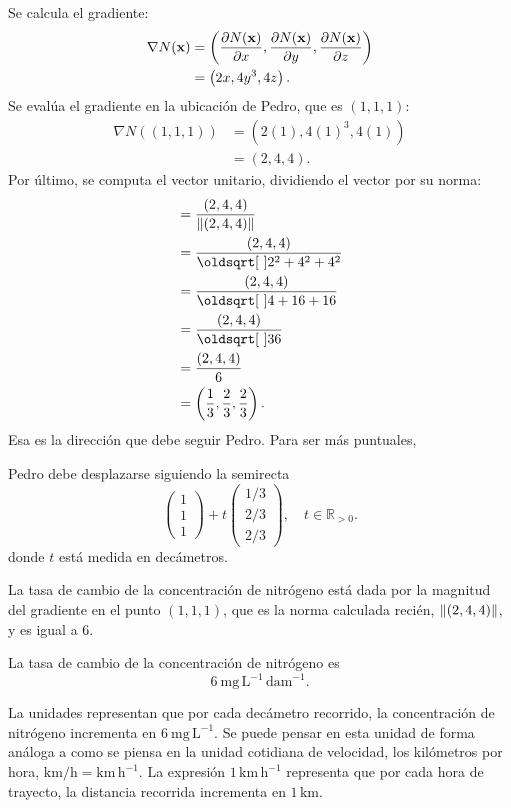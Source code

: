 \documentclass{fmbvecto}
\begin{document}
\begin{problema}[Pedro]
Se calcula el gradiente:
\begin{align*}
    \nabla N(\bvec{x}) &= \left( \dparder[N(\bvec{x})][x], \dparder[N(\bvec{x})][y], \dparder[N(\bvec{x})][z] \right) \\
    &= \left( 2x, 4y^3, 4z\right).
\end{align*}
Se evalúa el gradiente en la ubicación de Pedro, que es \((1, 1, 1)\):
\begin{align*}
    \nabla N((1, 1, 1)) &= \left( 2(1), 4(1)^3, 4(1)\right) \\
    &= \left( 2, 4, 4\right).
\end{align*}
Por último, se computa el vector unitario, dividiendo el vector por su norma:
\begin{align*}
    &= \frac{( 2, 4, 4)}{\norm{(2, 4, 4)}} \\
    &= \frac{( 2, 4, 4)}{\sqrt{2^2 + 4^2 + 4^2}} \\
    &= \frac{( 2, 4, 4)}{\sqrt{4 + 16 + 16}} \\
    &= \frac{( 2, 4, 4)}{\sqrt{36}}\\
    &= \frac{( 2, 4, 4)}{6}\\
    &= \left( \frac{1}{3}, \frac{2}{3}, \frac{2}{3}\right).
\end{align*}
Esa es la dirección que debe seguir Pedro. Para ser más puntuales, 
\begin{gbox}
    Pedro debe desplazarse siguiendo la semirecta \[\begin{pmatrix}
        1 \\ 1 \\ 1
    \end{pmatrix} + t\begin{pmatrix}
        1/3 \\ 2/3 \\ 2/3
        \end{pmatrix}, \quad t\in \mathbb{R}_{>0}. \]
    donde \(t\) está medida en decámetros.
\end{gbox}

La tasa de cambio de la concentración de nitrógeno está dada por la magnitud del gradiente en el punto \((1, 1, 1)\), que es la norma calculada recién, \(\left\lVert (2, 4, 4) \right\rVert\), y es igual a 6.
\begin{gbox}
    La tasa de cambio de la concentración de nitrógeno es \[6 \ \text{mg} \, \text{L}^{-1} \, \text{dam}^{-1}. \]
\end{gbox}
La unidades representan que por cada decámetro recorrido, la concentración de nitrógeno incrementa en \(6 \ \text{mg} \, \text{L}^{-1}\). Se puede pensar en esta unidad de forma análoga a como se piensa en la unidad cotidiana de velocidad, los kilómetros por hora, \( \text{km} / \text{h} = \text{km} \, \text{h}^{-1}\). La expresión \( 1 \, \text{km} \, \text{h}^{-1}\) representa que por cada hora de trayecto, la distancia recorrida incrementa en \( 1 \, \text{km} \).

\end{problema}
\end{document}
